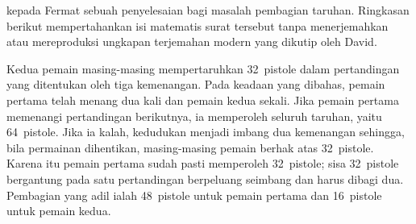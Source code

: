 kepada Fermat sebuah penyelesaian bagi masalah pembagian taruhan. Ringkasan berikut mempertahankan
isi matematis surat tersebut tanpa menerjemahkan atau mereproduksi ungkapan terjemahan modern yang
dikutip oleh David.
\par
Kedua pemain masing-masing mempertaruhkan 32~pistole dalam pertandingan yang ditentukan oleh tiga
kemenangan. Pada keadaan yang dibahas, pemain pertama telah menang dua kali dan pemain kedua sekali.
Jika pemain pertama memenangi pertandingan berikutnya, ia memperoleh seluruh taruhan, yaitu
64~pistole. Jika ia kalah, kedudukan menjadi imbang dua kemenangan sehingga, bila permainan dihentikan,
masing-masing pemain berhak atas 32~pistole. Karena itu pemain pertama sudah pasti memperoleh
32~pistole; sisa 32~pistole bergantung pada satu pertandingan berpeluang seimbang dan harus dibagi dua.
Pembagian yang adil ialah 48~pistole untuk pemain pertama dan 16~pistole untuk pemain kedua.

